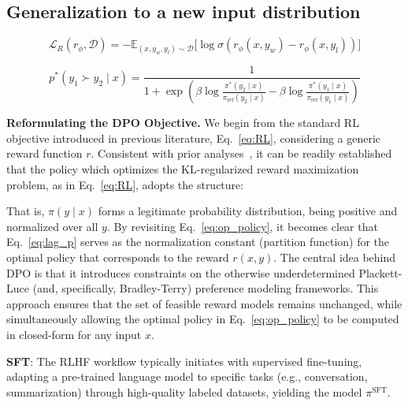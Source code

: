\subsection{Generalization to a new input distribution}

\begin{equation}\label{eq:reward_model}
    \mathcal{L}_R(r_{\phi}, \mathcal{D}) = -\mathbb{E}_{(x, y_w, y_l)\sim \mathcal{D}}\bigl[\log \sigma(r_{\phi}(x, y_w)- r_{\phi}(x, y_l))\bigr]
\end{equation}

\begin{equation}\label{eq:objective}
    p^*(y_1\succ y_2 \mid x)=\frac{1}{1 + \exp\left(\beta \log \frac{\pi^*(y_2\mid x)}{\pi_\text{ref}(y_2\mid x)} - \beta \log \frac{\pi^*(y_1\mid x)}{\pi_\text{ref}(y_1\mid x)}\right)}
\end{equation}

\textbf{Reformulating the DPO Objective.} We begin from the standard RL objective introduced in previous literature, Eq.~\ref{eq:RL}, considering a generic reward function $r$. Consistent with prior analyses~\citep{peters2007reinforcement, peng2019advantage, korbak2022reinforcement, go2023aligning}, it can be readily established that the policy which optimizes the KL-regularized reward maximization problem, as in Eq.~\ref{eq:RL}, adopts the structure:

That is, $\pi(y\mid x)$ forms a legitimate probability distribution, being positive and normalized over all $y$. By revisiting Eq.~\ref{eq:op_policy}, it becomes clear that Eq.~\ref{eq:lag_p} serves as the normalization constant (partition function) for the optimal policy that corresponds to the reward $r(x, y)$. The central idea behind DPO is that it introduces constraints on the otherwise underdetermined Plackett-Luce (and, specifically, Bradley-Terry) preference modeling frameworks. This approach ensures that the set of feasible reward models remains unchanged, while simultaneously allowing the optimal policy in Eq.~\ref{eq:op_policy} to be computed in closed-form for any input $x$.

\textbf{SFT}: The RLHF workflow typically initiates with supervised fine-tuning, adapting a pre-trained language model to specific tasks (e.g., conversation, summarization) through high-quality labeled datasets, yielding the model $\pi^\text{SFT}$.

